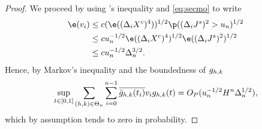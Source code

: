 \begin{proof}
    \begin{comment}
    where \begin{align} &v_n :=  2c H^n \Lambda n^{-1} \log(n) \sumin I_{\{(\djt)^2 > u_n\}} \notag \\ & w_n: = c H^n \sumin  (\djl)^2 I_{\{(\djt)^2 > u_n\}}\notag \end{align}  where $c$ is a sufficiently large constant, and $\Lambda$ is a finite-valued random variable satisfying  $\Lambda \ge  \sup_{t \in \domain} \vert b(t)\vert  + C $, where $C^{1/2}$ is the finite-valued random variable from Lemma \ref{lem:mylevy}.  Let  $\delta > 0$ be given, put  $x_n(t)  :=  \sumt\left(\sumin  \btghki(\dxf)^2 I_{A_i \cap B_i^c})\right)\ghk(t)$  and note that 
    \begin{align}
      \p &\left(  \sup_{t \in \domain}\vert x_n (t) \vert  > \delta\right) \le \p(v_n > \delta/2) + \p(w_n > \delta/2) \notag. 
      \label{}
    \end{align}
  Now let  $\varepsilon > 0$ be given and note that because  $\Lambda$ is almost surely finite,   there is a sufficiently large $K > 0$ such that $\p(\Lambda > K) \le \varepsilon/2$. Hence, 
\end{comment}
We  proceed by using \holder's inequality and \eqref{eq:secmo}   to write
\begin{align} 
  \e(v_i) & \le c (\e( (\dxc)^4))^{1/2} \p( (\djt)^2 > u_n)^{1/2} \notag \\ 
  & \le c u_n^{-1/2} \e( (\dxc)^4)^{1/2} \e( (\djt)^2)^{1/2} \notag \\ 
  & \le c u_n^{-1/2}\Delta_n^{3/2} \label{eq:vi}.
\end{align}
Hence,  by Markov's inequality and the boundedness of $g_{h,k}$ \begin{align} \sup_{t \in [0,1]}\sum_{(h,k) \in \Theta_n} \sum_{i = 0}^{n-1} \overline{\tilde{g}_{h,k}(t_i)} v_i g_{h,k}(t) = O_P(u_n^{-1/2}H^n \Delta_n^{1/2}),\end{align} 
which by assumption tends to zero in probability.


\end{proof}
